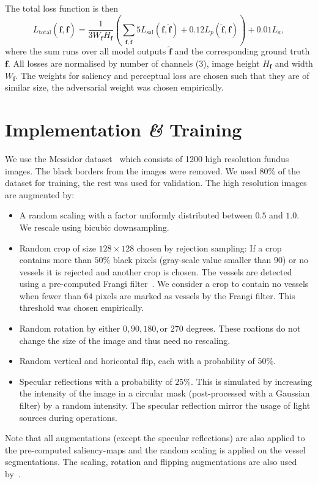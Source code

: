 \documentclass{scrartcl}
\newcommand{\img}{\bm{f}} %
\begin{document}
The total loss function is then
\begin{equation}
  \label{eq:total-loss}
L_\text{total}(\hat{\img}, \img) = \frac{1}{3 W_{\img} H_{\img}}
\left( \sum_{\img, \hat{\img}}
  5 L_{\text{sal}} (\img, \hat{\img}) + 0.12  L_p(\hat{\img}, \img) \right) + 0.01 L_a,
\end{equation}
where the sum runs over all model outputs \(\hat{\img}\) and the corresponding ground truth \(\img\).
All losses are normalised by number of channels (3), image height \(H_{\img}\) and width \(W_{\img}\).
The weights for saliency and perceptual loss are chosen such that they are of similar size, the adversarial weight was chosen empirically.

\section{Implementation \textit{\&} Training}
We use the Messidor dataset~\cite{Messidor} which consists of 1200 high resolution fundus images.
The black borders from the images were removed.
We used 80\% of the dataset for training, the rest was used for validation.
The high resolution images are augmented by:
\begin{itemize}
\item A random scaling with a factor uniformly distributed between $0.5$ and $1.0$.
  We rescale using bicubic downsampling.
\item Random crop of size $128 \times 128$ chosen by rejection sampling:
If a crop contains more than $50\%$ black pixels (gray-scale value smaller than 90) or no vessels it is rejected and another crop is chosen.
The vessels are detected using a pre-computed Frangi filter~\cite{Frangi}.
We consider a crop to contain no vessels when fewer than $64$ pixels are marked as vessels by the Frangi filter.
This threshold was chosen empirically.
\item Random rotation by either $0, 90, 180, \text{or } 270$ degrees.
  These roations do not change the size of the image and thus need no rescaling.
\item Random vertical and horicontal flip, each with a probability of $50\%$.
\item Specular reflections with a probability of $25\%$.
This is simulated by increasing the intensity of the image in a circular mask (post-processed with a Gaussian filter) by a random intensity.
The specular reflection mirror the usage of light sources during operations.
\end{itemize}
Note that all augmentations (except the specular reflections) are also applied to the pre-computed saliency-maps and the random scaling is applied on the vessel segmentations.
The scaling, rotation and flipping augmentations are also used by~\cite{LapSRN}.
\end{document}
